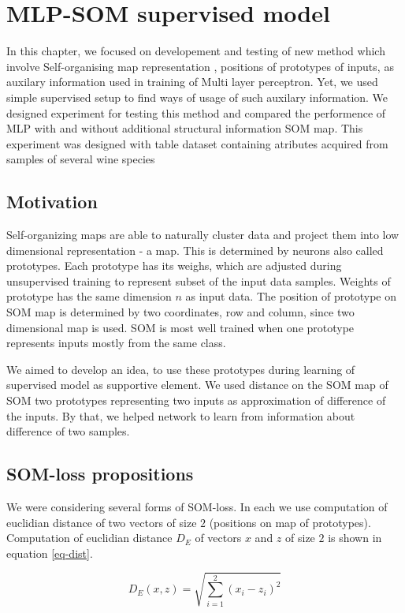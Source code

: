 \chapter{MLP-SOM supervised model}
\label{chap:cotraining}

In this chapter, we focused on developement and testing of new method which involve  Self-organising map representation , positions of prototypes of inputs, as auxilary information used in training of Multi layer perceptron. Yet, we used simple supervised setup to find ways of usage of such auxilary information. We designed experiment for testing this method and compared the performence of MLP with and without additional structural information SOM map. This experiment was designed with table dataset containing atributes acquired from samples of several wine species


\section{Motivation}
Self-organizing maps are able to naturally cluster data and project them into low dimensional representation - a map. This is determined by neurons also called prototypes. Each prototype has its weighs, which are adjusted during unsupervised training to represent subset of the input data samples. Weights of prototype has the same dimension $n$ as input data. The position of prototype on SOM map is determined by two coordinates, row and column, since two dimensional map is used. SOM is most well trained when one prototype represents inputs mostly from the same class.

We aimed to develop an idea, to use these prototypes during learning of supervised model as supportive element. We used distance on the SOM map of SOM two prototypes representing two inputs as approximation of difference of the inputs. By that, we helped network to learn from information about difference of two samples.

\newpage
\section{SOM-loss propositions}
We were considering several forms of SOM-loss. In each we use computation of euclidian distance of two vectors of size $2$ (positions on map of prototypes). Computation of euclidian distance $D_E$ of vectors $x$ and $z$ of size $2$  is shown in equation \ref{eq-dist}.

\begin{equation}
    D_E(x, z) = \sqrt{\sum_{i=1}^{2} {(x_i - z_i)}^2}
    \label{eq-dist}
\end{equation}
\bigskip

